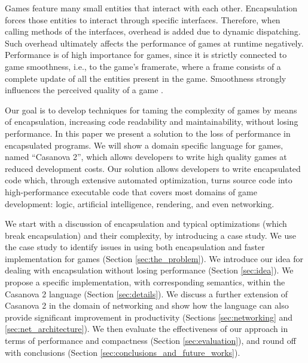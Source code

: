 Games feature many small entities that interact with each other. Encapsulation forces those entities to interact through specific interfaces. Therefore, when calling methods of the interfaces, overhead is added due to dynamic dispatching. Such overhead ultimately affects the performance of games at runtime negatively. Performance is of high importance for games, since it is strictly connected to game smoothness, i.e., to the game's framerate, where a frame consists of a complete update of all the entities present in the game. Smoothness strongly influences the perceived quality of a game \cite{claypool2009perspectives}.

Our goal is to develop techniques for taming the complexity of games by means of encapsulation, increasing code readability and maintainability, without losing performance.
In this paper we present a solution to the loss of performance in encapsulated programs. We will show a domain specific language for games, named ``Casanova 2'', which allows developers to write high quality games at reduced development costs. Our solution allows developers to write encapsulated code which, through extensive automated optimization, turns source code into high-performance executable code that covers most domains of game development: logic, artificial intelligence, rendering, and even networking.


We start with a discussion of encapsulation and typical optimizations (which break encapsulation) and their complexity, by introducing a case study. We use the case study to identify issues in using both encapsulation and faster implementation for games (Section \ref{sec:the_problem}). We introduce our idea for dealing with encapsulation without losing performance (Section \ref{sec:idea}). We propose a specific implementation, with corresponding semantics, within the Casanova 2 language (Section \ref{sec:details}). We discuss a further extension of Casanova 2 in the domain of networking and show how the language can also provide significant improvement in productivity (Sections \ref{sec:networking} and \ref{sec:net_architecture}). We then evaluate the effectiveness of our approach in terms of performance and compactness (Section \ref{sec:evaluation}), and round off with conclusions (Section \ref{sec:conclusions_and_future_works}). 